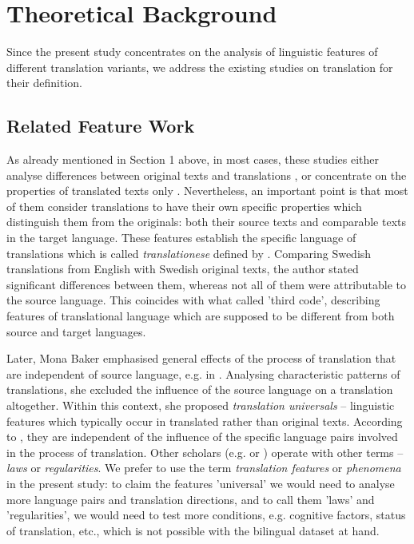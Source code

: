\documentclass[output=paper]{LSP/langsci}
\begin{document}
\section{Theoretical Background}

Since the present study concentrates on the analysis of linguistic features of different translation variants, we address the existing studies on translation for their definition.

\subsection{Related Feature Work}

As already mentioned in Section 1 above, in most cases, these studies either analyse differences between original texts and translations \citep{House1997,Matthiessen2001,Teich2003,Hansen2003,Steiner2004}, or concentrate on the properties of translated texts only \citep{Baker1995}. Nevertheless, an important point is that most of them consider translations to have their own specific properties which distinguish them from the originals: both their source texts and comparable texts in the target language. These features establish the specific language of translations which is called \textit{translationese} defined by \citep{Gellerstam1986}. Comparing Swedish translations from English with Swedish original texts, the author stated signiﬁcant differences between them, whereas not all of them were attributable to the source language. This coincides with what \citet{Frawley1984} called 'third code’, describing features of translational language which are supposed to be different from both source and target languages.

Later, Mona Baker emphasised general effects of the process of translation that are independent of source language, e.g. in \citet{Baker1993,Baker1995}. Analysing characteristic patterns of translations, she excluded the influence of the source language on a translation altogether. Within this context, she proposed \textit{translation universals} – linguistic features which typically occur in translated rather than original texts. According to \citet{Baker1993}, they are independent of the influence of the specific language pairs involved in the process of translation. Other scholars (e.g. \citealt{Toury1995} or \citealt{Chesterman2004}) operate with other terms – \textit{laws} or \textit{regularities}. We prefer to use the term \textit{translation features} or \textit{phenomena} in the present study: to claim the features 'universal’ we would need to analyse more language pairs and translation directions, and to call them 'laws’ and 'regularities’, we would need to test more conditions, e.g. cognitive factors, status of translation, etc., which is not possible with the bilingual dataset at hand.
\end{document}
